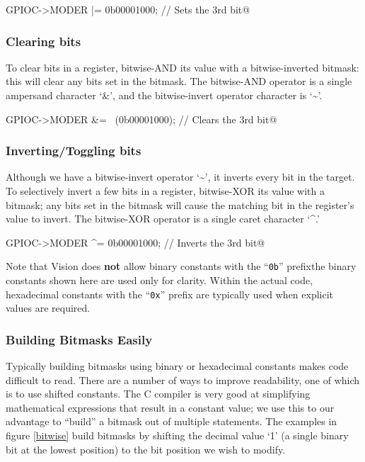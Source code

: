 \documentclass[11pt,fleqn]{book} %
\makeatletter
\newcommand{\ilcode}[1]{
    \begin{center} \parskip=-15pt \colorbox{gray!20!white}{
        \parbox{\columnwidth-2\fboxsep}{
            \lstinline@#1@
        }
    } \end{center}
}
\makeatother
\begin{document}
\ilcode{GPIOC->MODER |= 0b00001000;    // Sets the 3rd bit}%

\subsubsection{Clearing bits}
To clear bits in a register, bitwise-AND its value with a bitwise-inverted bitmask: this will clear any bits set in the bitmask. The bitwise-AND operator is a single ampersand character `\&', and the bitwise-invert operator character is `\textasciitilde'.
\ilcode{GPIOC->MODER \&= ~(0b00001000);    // Clears the 3rd bit}%

\subsubsection{Inverting/Toggling bits}
Although we have a bitwise-invert operator `\textasciitilde', it inverts every bit in the target. To selectively invert a few bits in a register, bitwise-XOR its value with a bitmask; any bits set in the bitmask will cause the matching bit in the register's value to invert. The bitwise-XOR operator is a single caret character `\textasciicircum.'

\ilcode{GPIOC->MODER ^= 0b00001000;    // Inverts the 3rd bit}%

\begin{warning}
    Note that {\textmu}Vision does \textbf{not} allow binary constants with the ``\texttt{0b}'' prefix\textemdash the binary constants shown here are used only for clarity. Within the actual code, hexadecimal constants with the ``\texttt{0x}'' prefix are typically used when explicit values are required.  
\end{warning}

\subsubsection{Building Bitmasks Easily}

Typically building bitmasks using binary or hexadecimal constants makes code difficult to read. There are a number of ways to improve readability, one of which is to use shifted constants. The C compiler is very good at simplifying mathematical expressions that result in a constant value; we use this to our advantage to ``build'' a bitmask out of multiple statements. The examples in figure \vref{bitwise} build bitmasks by shifting the decimal value `1' (a single binary bit at the lowest position) to the bit position we wish to modify.
\end{document}
